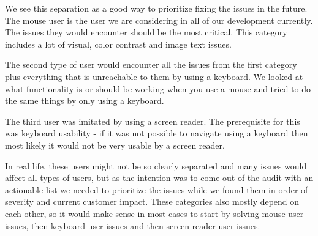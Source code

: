 \documentclass{master_thesis}
\begin{document}
We see this separation as a good way to prioritize fixing the issues in the future. The mouse user is the user we are considering in all of our development currently. The issues they would encounter should be the most critical. This category includes a lot of visual, color contrast and image text issues.

The second type of user would encounter all the issues from the first category plus everything that is unreachable to them by using a keyboard. We looked at what functionality is or should be working when you use a mouse and tried to do the same things by only using a keyboard.

The third user was imitated by using a screen reader. The prerequisite for this was keyboard usability - if it was not possible to navigate using a keyboard then most likely it would not be very usable by a screen reader.

In real life, these users might not be so clearly separated and many issues would affect all types of users, but as the intention was to come out of the audit with an actionable list we needed to prioritize the issues while we found them in order of severity and current customer impact. These categories also mostly depend on each other, so it would make sense in most cases to start by solving mouse user issues, then keyboard user issues and then screen reader user issues.
\end{document}

